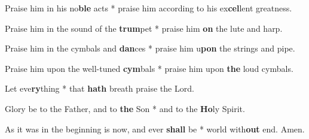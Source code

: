 \begin{multicols}{2}
	Praise him in his no\textbf{ble} acts * praise him according to his ex\textbf{cel}lent greatness.
	
	Praise him in the sound of the \textbf{trum}pet * praise him \textbf{on} the lute and harp.
	
	Praise him in the cymbals and \textbf{dan}ces * praise him u\textbf{pon} the strings and pipe.
	
	Praise him upon the well-tuned \textbf{cym}bals * praise him upon \textbf{the} loud cymbals.
	
	Let eve\textbf{ry}thing * that \textbf{hath} breath praise the Lord.
	
	Glory be to the Father, and to \textbf{the} Son * and to the \textbf{Ho}ly Spirit.
	
	As it was in the beginning is now, and ever \textbf{shall} be * world with\textbf{out} end. Amen.
\end{multicols}